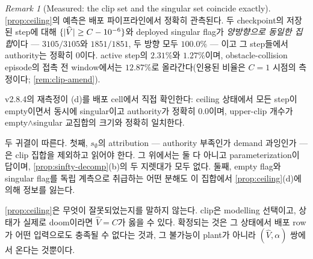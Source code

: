 \documentclass[11pt]{article}
\theoremstyle{plain}
\theoremstyle{definition}
\theoremstyle{remark}
\newtheorem{remark}[theorem]{Remark}
\DeclarePairedDelimiter{\abs}{\lvert}{\rvert}
\newcommand{\Vhat}{\widehat V}
\begin{document}
\begin{remark}[Measured: the clip set and the singular set coincide exactly]\label{rem:clip-measured}
\cref{prop:ceiling}의 예측은 배포 파이프라인에서 정확히 관측된다. 두 checkpoint의 저장된 step에
대해 $\{\abs{\Vhat}\ge C-10^{-6}\}$와 deployed singular flag가 \emph{양방향으로 동일한 집합}이다 ---
$3105/3105$와 $1851/1851$, 두 방향 모두 $100.0\%$ --- 이고 그 step들에서 authority는 정확히 $0$이다.
active step의 $2.31\%$와 $1.27\%$이며, obstacle-collision episode의 접촉 전 window에서는
$12.87\%$로 올라간다(인용된 비율은 $C=1$ 시점의 측정이다; \cref{rem:clip-amend}).

v2.8.4의 재측정이 (d)를 배포 cell에서 직접 확인한다: ceiling 상태에서 모든 step이 empty이면서
동시에 singular이고 authority가 정확히 $0.0$이며, upper-clip 개수가 empty$\wedge$singular 교집합의
크기와 정확히 일치한다.

두 귀결이 따른다. 첫째, $s_\emptyset$의 attribution --- authority 부족인가 demand 과잉인가 ---
은 clip 집합을 제외하고 읽어야 한다. 그 위에서는 둘 다 아니고 parameterization이 답이며,
\cref{prop:sinfty-decomp}(b)의 두 지렛대가 모두 없다. 둘째, empty flag와 singular flag를 독립
계측으로 취급하는 어떤 분해도 이 집합에서 \cref{prop:ceiling}(d)에 의해 정보를 잃는다.

\cref{prop:ceiling}은 무엇이 잘못되었는지를 말하지 않는다. clip은 modelling 선택이고, 상태가
실제로 doom이라면 $\Vhat=C$가 옳을 수 있다. 확정되는 것은 그 상태에서 배포 row가 어떤
입력으로도 충족될 수 없다는 것과, 그 불가능이 plant가 아니라 $(\Vhat,\alpha)$ 쌍에서 온다는 것뿐이다.
\end{remark}
\end{document}
